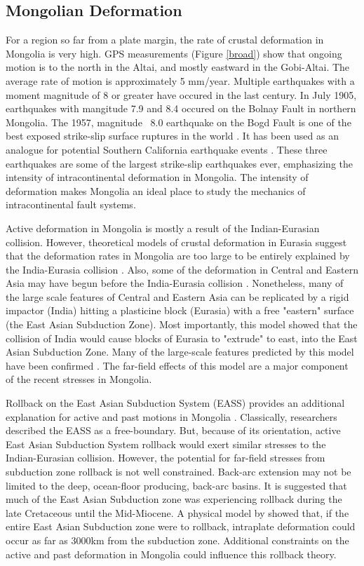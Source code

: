\documentclass[10pt,a4paper]{article}
\begin{document}
\subsection{Mongolian Deformation}
For a region so far from a plate margin, the rate of crustal deformation in Mongolia is very high. GPS measurements (Figure \ref{broad}) show that ongoing motion is to the north in the Altai, and mostly eastward in the Gobi-Altai\citep{Calais2003}. The average rate of motion is approximately 5 mm/year. Multiple earthquakes with a moment magnitude of 8 or greater have occured in the last century. In July 1905, earthquakes with mangitude 7.9 and 8.4 occured on the Bolnay Fault in northern Mongolia. The 1957, magnitude ~8.0 earthquake on the Bogd Fault is one of the best exposed strike-slip surface ruptures in the world\citep{Kurushin1998} \citep{Okal1976a} \citep{Pollitz2003}. It has been used as an analogue for potential Southern California earthquake events \citep{Bayarsayhan1996}. These three earthquakes are some of the largest strike-slip earthquakes ever, emphasizing the intensity of intracontinental deformation in Mongolia. The intensity of deformation makes Mongolia an ideal place to study the mechanics of intracontinental fault systems.

	Active deformation in Mongolia is mostly a result of the Indian-Eurasian collision. However, theoretical models of crustal deformation in Eurasia suggest that the deformation rates in Mongolia are too large to be entirely explained by the India-Eurasia collision \citep{Calais2002a}. Also, some of the deformation in Central and Eastern Asia may have begun before the India-Eurasia collision \citep{Schellart2005}. Nonetheless, many of the large scale features of Central and Eastern Asia can be replicated by a rigid impactor (India) hitting a plasticine block (Eurasia) with a free "eastern" surface (the East Asian Subduction Zone)\citep{Tapponnier1982}. Most importantly, this model showed that the collision of India would cause blocks of Eurasia to "extrude" to east, into the East Asian Subduction Zone.  Many of the large-scale features predicted by this model have been confirmed \citep{Schellart2005}\cite{Yin2010}. The far-field effects of this model are a major component of the recent stresses in Mongolia. 

	 Rollback on the East Asian Subduction System (EASS) provides an additional explanation for active and past motions in Mongolia \citep{Schellart2005}. Classically, researchers described the EASS as a free-boundary. But, because of its orientation, active East Asian Subduction System rollback would exert similar stresses to the Indian-Eurasian collision. However, the potential for far-field stresses from subduction zone rollback is not well constrained. Back-arc extension may not be limited to the deep, ocean-floor producing, back-arc basins. It is suggested that much of the East Asian Subduction zone was experiencing rollback during the late Cretaceous until the Mid-Miocene. A physical model by \citet{Schellart2005} showed that, if the entire East Asian Subduction zone were to rollback, intraplate deformation could occur as far as 3000km from the subduction zone. Additional constraints on the active and past deformation in Mongolia could influence this rollback theory. 
\end{document}
